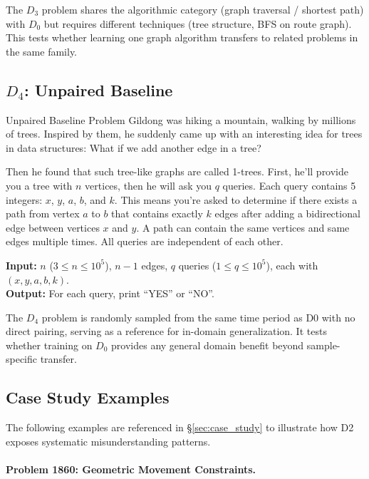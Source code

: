 \documentclass[]{bytedance_seed}
\theoremstyle{plain}
\theoremstyle{definition}
\theoremstyle{remark}
\begin{document}
\noindent The $D_3$ problem shares the algorithmic category (graph traversal / shortest path) with $D_0$ but requires different techniques (tree structure, BFS on route graph). This tests whether learning one graph algorithm transfers to related problems in the same family.

\subsection*{$D_4$: Unpaired Baseline}

\begin{problembox}{Unpaired Baseline Problem}
Gildong was hiking a mountain, walking by millions of trees. Inspired by them, he suddenly came up with an interesting idea for trees in data structures: What if we add another edge in a tree?

Then he found that such tree-like graphs are called 1-trees. First, he'll provide you a tree with $n$ vertices, then he will ask you $q$ queries. Each query contains 5 integers: $x$, $y$, $a$, $b$, and $k$. This means you're asked to determine if there exists a path from vertex $a$ to $b$ that contains exactly $k$ edges after adding a bidirectional edge between vertices $x$ and $y$. A path can contain the same vertices and same edges multiple times. All queries are independent of each other.

\vspace{1.5mm}
\noindent\textbf{Input:} $n$ ($3 \le n \le 10^5$), $n-1$ edges, $q$ queries ($1 \le q \le 10^5$), each with $(x, y, a, b, k)$.\\
\textbf{Output:} For each query, print ``YES'' or ``NO''.
\end{problembox}

\noindent The $D_4$ problem is randomly sampled from the same time period as D0 with no direct pairing, serving as a reference for in-domain generalization. It tests whether training on $D_0$ provides any general domain benefit beyond sample-specific transfer.

\iffalse
\subsection*{Case Study Examples}
\label{app:casestudy-examples}

The following examples are referenced in \S\ref{sec:case_study} to illustrate how D2 exposes systematic misunderstanding patterns.

\paragraph{Problem 1860: Geometric Movement Constraints.}
\end{document}

